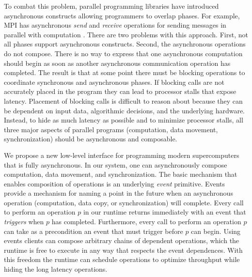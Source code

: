 To combat this problem, parallel programming libraries have introduced
asynchronous constructs allowing programmers to overlap phases.  For
example, MPI has asynchronous {\em send} and {\em receive} operations
for sending messages in parallel with computation \cite{MPI}.  There
are two problems with this approach.  First, not all phases support
asynchronous constructs.  Second, the asynchronous operations do not
compose.  There is no way to express that one asynchronous computation
should begin as soon as another asynchronous communication operation
has completed.  The result is that at some point there must be
blocking operations to coordinate synchronous and asynchronous phases.
If blocking calls are not accurately placed in the program they can
lead to processor stalls that expose latency.  Placement of blocking
calls is difficult to reason about because 
they can be dependent on input data, algorithmic decisions, 
and the underlying hardware.  Instead, to hide as much
latency as possible and to minimize processor stalls, 
all three major aspects of parallel programs (computation, data movement,
synchronization) should be asynchronous and composable.

We propose a new low-level interface for programming modern
supercomputers that is fully asynchronous. In our system, one can
asynchronously compose computation, data movement, and
synchronization.  The basic mechanism that enables composition of operations
is an underlying {\em event} primitive.  Events provide a mechanism
for naming a point in the future when an asynchronous operation
(computation, data copy, or synchronization) will complete.  Every
call to perform an operation $p$ in our runtime returns immediately
with an event that {\em triggers} when $p$ has completed.
Furthermore, every call to perform an operation $p$ can take as a
precondition an event that must trigger before $p$ can begin.  Using
events clients can compose arbitrary chains of dependent
operations, which the runtime is free to execute in any way that
respects the event dependences.  With this freedom the runtime can
schedule operations to optimize throughput while hiding the long
latency operations.

